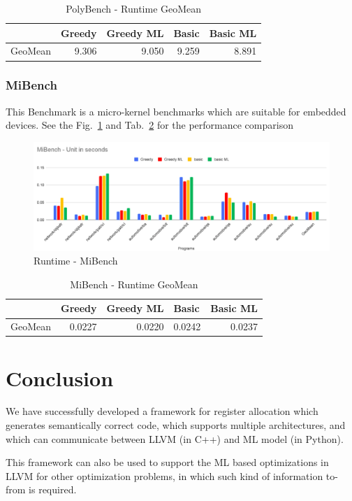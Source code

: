 \begin{table}[h!]
\begin{tabular}{|l|l|l|l|l|}
\hline
 & \textbf{Greedy} & \textbf{Greedy ML} & \textbf{Basic} & \textbf{Basic ML} \\ \hline
GeoMean & \multicolumn{1}{r|}{9.306} & \multicolumn{1}{r|}{9.050} & \multicolumn{1}{r|}{9.259} & \multicolumn{1}{r|}{8.891} \\ \hline
\end{tabular}
\centering
\caption{PolyBench - Runtime GeoMean}
\label{tab:mlra:polybench}
\end{table}

\subsubsection{MiBench}
This Benchmark is a micro-kernel benchmarks which are suitable for embedded devices.  See the Fig.~\ref{fig:mlra-mibench} and Tab.~\ref{tab:mlra:mibench} for the performance comparison

\begin{figure}[h!]
    \centering
    \includegraphics[scale=0.4]{figures/chapter-5/MiBench.png}
    \caption{Runtime - MiBench}
     \label{fig:mlra-mibench}
\end{figure}

\begin{table}[h!]
\begin{tabular}{|l|l|l|l|l|}
\hline
 & \textbf{Greedy} & \textbf{Greedy ML} & \textbf{Basic} & \textbf{Basic ML} \\ \hline
GeoMean & \multicolumn{1}{r|}{0.0227} & \multicolumn{1}{r|}{0.0220} & \multicolumn{1}{r|}{0.0242} & \multicolumn{1}{r|}{0.0237} \\ \hline
\end{tabular}
\centering
\caption{MiBench - Runtime GeoMean}
\label{tab:mlra:mibench}
\end{table}

\section{Conclusion}\label{sec:mlra:conclusion}
We have successfully developed a framework for register allocation which generates semantically correct code, which supports multiple architectures, and which can communicate between LLVM (in C++) and ML model (in Python).

This framework can also be used to support the ML based optimizations in LLVM for other optimization problems, in which such kind of information to-from is required.

